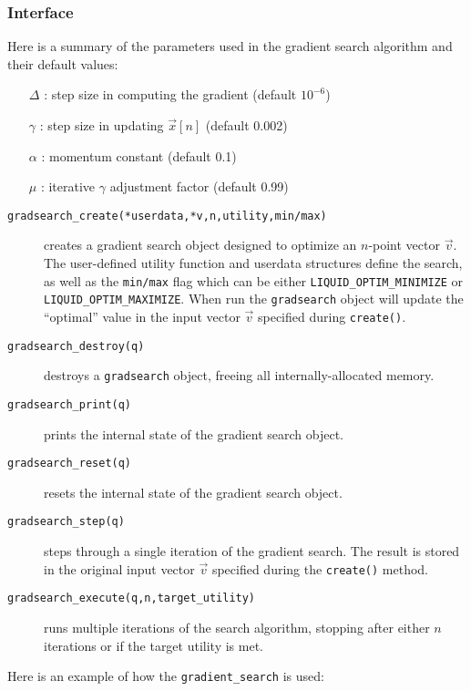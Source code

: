 \subsubsection{Interface}
Here is a summary of the parameters used in the gradient search algorithm and
their default values:
\begin{itemize}
\item[$\Delta$] : step size in computing the gradient (default $10^{-6}$)
\item[$\gamma$] : step size in updating $\vec{x}[n]$ (default 0.002)
\item[$\alpha$] : momentum constant (default 0.1)
\item[$\mu$]    : iterative $\gamma$ adjustment factor (default 0.99)
\end{itemize}
%
\begin{description}
\item[{\tt gradsearch\_create(*userdata,*v,n,utility,min/max)}]
    creates a gradient search object designed to optimize an $n$-point
    vector $\vec{v}$.
    The user-defined utility function and userdata structures define the
    search, as well as the {\tt min/max} flag which can be either
    {\tt LIQUID\_OPTIM\_MINIMIZE} or
    {\tt LIQUID\_OPTIM\_MAXIMIZE}.
    When run the {\tt gradsearch} object will update the ``optimal''
    value in the input vector $\vec{v}$ specified during
    {\tt create()}.
\item[{\tt gradsearch\_destroy(q)}]
    destroys a {\tt gradsearch} object, freeing all internally-allocated
    memory.
\item[{\tt gradsearch\_print(q)}]
    prints the internal state of the gradient search object.
\item[{\tt gradsearch\_reset(q)}]
    resets the internal state of the gradient search object.
\item[{\tt gradsearch\_step(q)}]
    steps through a single iteration of the gradient search.
    The result is stored in the original input vector $\vec{v}$
    specified during the {\tt create()} method.
\item[{\tt gradsearch\_execute(q,n,target\_utility)}]
    runs multiple iterations of the search algorithm,
    stopping after either $n$ iterations or if the target utility is
    met.
\end{description}
%
Here is an example of how the {\tt gradient\_search} is used:
% 
